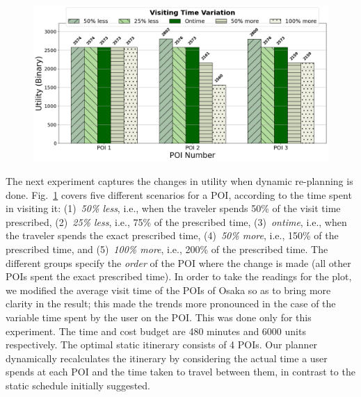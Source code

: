 \begin{figure}[t]
    \centering
    \includegraphics[width=\figwidth]{plots/dynamic_pkj.png}
    \label{fig:dynamic}
\end{figure}

The next experiment captures the changes in utility when dynamic re-planning is done.
Fig.~\ref{fig:dynamic} covers five different scenarios for a POI, according to the time spent in visiting it: (1)~\emph{50\% less}, i.e., when the traveler spends 50\% of the visit time prescribed, (2)~\emph{25\% less}, i.e., 75\% of the prescribed time, (3)~\emph{ontime}, i.e., when the traveler spends the exact prescribed time, (4)~\emph{50\% more}, i.e., 150\% of the prescribed time, and (5)~\emph{100\% more}, i.e., 200\% of the prescribed time.
The different groups specify the \emph{order} of the POI where the change is made (all other POIs spent the exact prescribed time).
In order to take the readings for the plot, we modified the average visit time of the POIs of Osaka so as to bring more clarity in the result; this made the trends more pronounced in the case of the variable time spent by the user on the POI.
This was done only for this experiment.
The time and cost budget are 480 minutes and 6000 units respectively.
The optimal static itinerary consists of 4 POIs.
Our planner dynamically recalculates the itinerary by considering the actual time a user spends at each POI and the time taken to travel between them, in contrast to the static schedule initially suggested.

